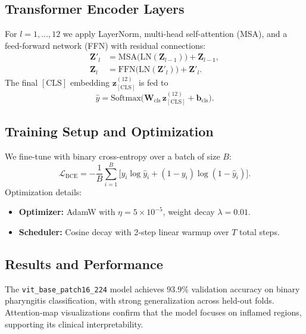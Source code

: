 \subsection{Transformer Encoder Layers}
For \(l=1,\dots,12\) we apply LayerNorm, multi-head self-attention (MSA), and a feed-forward network (FFN) with residual connections:
\[
  \begin{aligned}
    \mathbf{Z}'_{l} &= \mathrm{MSA}\bigl(\mathrm{LN}(\mathbf{Z}_{l-1})\bigr) + \mathbf{Z}_{l-1},\\
    \mathbf{Z}_{l}  &= \mathrm{FFN}\bigl(\mathrm{LN}(\mathbf{Z}'_{l})\bigr)  + \mathbf{Z}'_{l}.
  \end{aligned}
\]
The final \(\mathrm{[CLS]}\) embedding \(\mathbf{z}_{\mathrm{[CLS]}}^{(12)}\) is fed to
\[
  \hat{y}
  = \mathrm{Softmax}\!\bigl(\mathbf{W}_{\mathrm{cls}}\,\mathbf{z}_{\mathrm{[CLS]}}^{(12)} + \mathbf{b}_{\mathrm{cls}}\bigr).
\]

\subsection{Training Setup and Optimization}
We fine-tune with binary cross-entropy over a batch of size \(B\):
\[
  \mathcal{L}_{\mathrm{BCE}}
  = -\frac{1}{B}\sum_{i=1}^B
    \bigl[y_i\log\hat{y}_i + (1 - y_i)\log(1 - \hat{y}_i)\bigr].
\]
Optimization details:
\begin{itemize}
  \item \textbf{Optimizer:} AdamW with \(\eta=5\times10^{-5}\), weight decay \(\lambda=0.01\).  
  \item \textbf{Scheduler:} Cosine decay with 2‐step linear warmup over \(T\) total steps.  
\end{itemize}

\subsection{Results and Performance}
The \texttt{vit\_base\_patch16\_224} model achieves \(\mathbf{93.9\%}\) validation accuracy on binary pharyngitis classification, with strong generalization across held-out folds. Attention‐map visualizations confirm that the model focuses on inflamed regions, supporting its clinical interpretability.